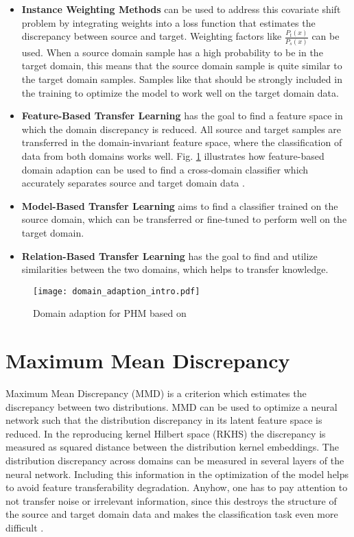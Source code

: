 \begin{itemize}
\item \textbf{Instance Weighting Methods} can be used to address this covariate shift problem by integrating weights into a loss function that estimates the discrepancy between source and target. Weighting factors like $\frac{P_{t}(x)}{P_{s}(x)}$ can be used. When a source domain sample has a high probability to be in the target domain, this means that the source domain sample is quite similar to the target domain samples. Samples like that should be strongly included in the training to optimize the model to work well on the target domain data.
\item \textbf{Feature-Based Transfer Learning} has the goal to find a feature space in which the domain discrepancy is reduced. All source and target samples are transferred in the domain-invariant feature space, where the classification of data from both domains works well. Fig. \ref{fig:Domain_adaption_intro} illustrates how feature-based domain adaption can be used to find a cross-domain classifier which accurately separates source and target domain data \cite{Pandhare2021}. 
\item \textbf{Model-Based Transfer Learning} aims to find a classifier trained on the source domain, which can be transferred or fine-tuned to perform well on the target domain.
\item \textbf{Relation-Based Transfer Learning} has the goal to find and utilize similarities between the two domains, which helps to transfer knowledge. 
\end{itemize}

\begin{figure}[H]
  \centering
  \texttt{[image: domain\_adaption\_intro.pdf]}
  \caption {Domain adaption for PHM based on \cite{Pandhare2021}} \label{fig:Domain_adaption_intro}
\end{figure}


\section{Maximum Mean Discrepancy}
Maximum Mean Discrepancy (MMD) is a criterion which estimates the discrepancy between two distributions. MMD can be used to optimize a neural network such that the distribution discrepancy in its latent feature space is reduced. In the reproducing kernel Hilbert space (RKHS) the discrepancy is measured as squared distance between the distribution kernel embeddings. The distribution discrepancy across domains can be measured in several layers of the neural network. Including this information in the optimization of the model helps to avoid feature transferability degradation. Anyhow, one has to pay attention to not transfer noise or irrelevant information, since this destroys the structure of the source and target domain data and makes the classification task even more difficult \cite{li2020}. 

